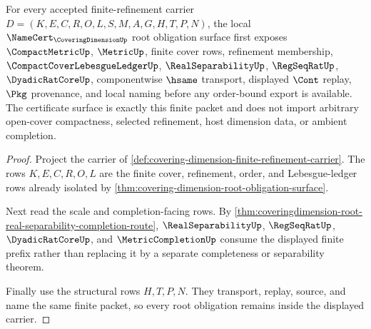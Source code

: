 \begin{theorem}
\label{thm:covering-dimension-finite-refinement-namecert-obligations}
For every accepted finite-refinement carrier $D=(K,E,C,R,O,L,S,M,A,G,H,T,P,N)$, the local $\NameCert_{\CoveringDimensionUp}$ root obligation surface first exposes $\CompactMetricUp$, $\MetricUp$, finite cover rows, refinement membership, $\CompactCoverLebesgueLedgerUp$, $\RealSeparabilityUp$, $\RegSeqRatUp$, $\DyadicRatCoreUp$, componentwise $\hsame$ transport, displayed $\Cont$ replay, $\Pkg$ provenance, and local naming before any order-bound export is available. The certificate surface is exactly this finite packet and does not import arbitrary open-cover compactness, selected refinement, host dimension data, or ambient completion.
\end{theorem}
\begin{proof}
Project the carrier of \autoref{def:covering-dimension-finite-refinement-carrier}. The rows $K,E,C,R,O,L$ are the finite cover, refinement, order, and Lebesgue-ledger rows already isolated by \autoref{thm:covering-dimension-root-obligation-surface}.

Next read the scale and completion-facing rows. By \autoref{thm:coveringdimension-root-real-separability-completion-route}, $\RealSeparabilityUp$, $\RegSeqRatUp$, $\DyadicRatCoreUp$, and $\MetricCompletionUp$ consume the displayed finite prefix rather than replacing it by a separate completeness or separability theorem.

Finally use the structural rows $H,T,P,N$. They transport, replay, source, and name the same finite packet, so every root obligation remains inside the displayed carrier.
\end{proof}

